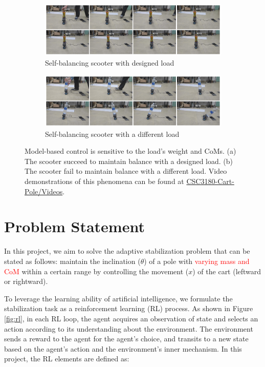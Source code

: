 \documentclass[10pt,a4paper]{article}
\begin{document}
\begin{figure}
	\centering
	\begin{subfigure}[b]{1\textwidth}
		\centering
		\includegraphics[width=1\linewidth]{figure/success}
		\caption{Self-balancing scooter with designed load}
		\label{fig:success}
	\end{subfigure}
	\hfill
	\begin{subfigure}[b]{1\textwidth}
		\centering
		\includegraphics[width=1\linewidth]{figure/fail}
		\caption{Self-balancing scooter with a different load}
		\label{fig:fail}
	\end{subfigure}
	\caption{Model-based control is sensitive to the load's weight and CoMs. (a) The scooter succeed to maintain balance with a designed load. (b) The scooter fail to maintain balance with a different load. Video demonstrations of this phenomena can be found at \href{https://1drv.ms/f/s!AmutmbT5H6Pkm0sNJx83Q54XewmB?e=HUkzYK}{CSC3180-Cart-Pole/Videos}.}
	\label{fig:different_rider}
\end{figure}

\section{Problem Statement}
In this project, we aim to solve the adaptive stabilization problem that can be stated as follows: maintain the inclination ($\theta$) of a pole with \textcolor{red}{varying mass and CoM} within a certain range by controlling the movement ($x$) of the cart (leftward or rightward).

To leverage the learning ability of artificial intelligence, we formulate the stabilization task as a reinforcement learning (RL) process. As shown in Figure \ref{fig:rl}, in each RL loop, the agent acquires an observation of state and selects an action according to its understanding about the environment. The environment sends a reward to  the agent for the agent's choice, and transits to a new state based on the agent's action and the environment's inner mechanism. In this project, the RL elements are defined as:
\end{document}
